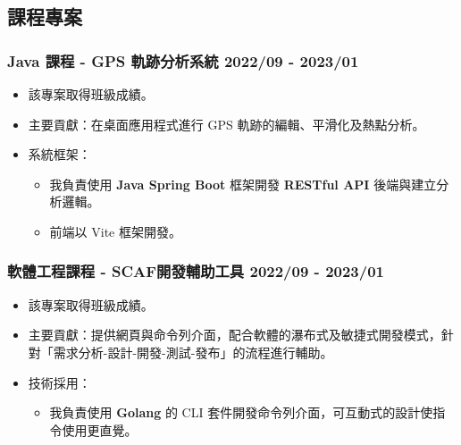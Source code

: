 \subsection*{課程專案}

\subsubsection*{Java 課程 - GPS 軌跡分析系統 \hfill 2022/09 - 2023/01}
\begin{itemize}
    \item 該專案取得班級成績。
    \item 主要貢獻：在桌面應用程式進行 GPS 軌跡的編輯、平滑化及熱點分析。
    \item 系統框架：
    \begin{itemize}
        \item 我負責使用 \textbf{Java Spring Boot} 框架開發 \textbf{RESTful API} 後端與建立分析邏輯。
        \item 前端以 Vite 框架開發。
    \end{itemize}
\end{itemize}

\subsubsection*{軟體工程課程 - SCAF開發輔助工具 \hfill 2022/09 - 2023/01}
\begin{itemize}
    \item 該專案取得班級成績。
    \item 主要貢獻：提供網頁與命令列介面，配合軟體的瀑布式及敏捷式開發模式，針對「需求分析-設計-開發-測試-發布」的流程進行輔助。
    \item 技術採用：
    \begin{itemize}
        \item 我負責使用 \textbf{Golang} 的 CLI 套件開發命令列介面，可互動式的設計使指令使用更直覺。
    \end{itemize}
\end{itemize}

